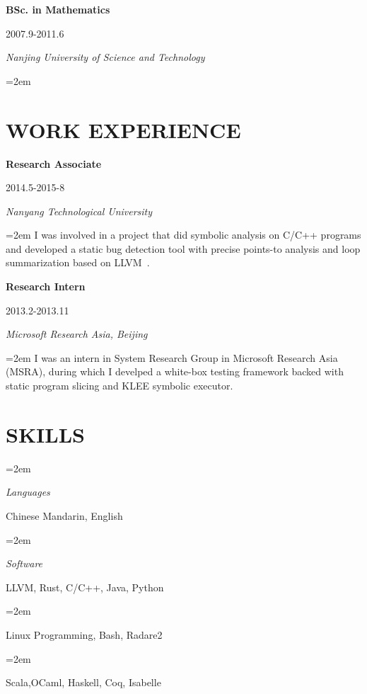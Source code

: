 \documentclass[paper=a4,fontsize=11pt]{article} %
\newlength{\spacebox}
\newcommand{\sepspace}{\vspace*{9pt}}		%
\newcommand{\NewPart}[1]{\section*{\uppercase{#1}}}
\newcommand{\PersonalEntry}[2]{
		\noindent\hangindent=2em\hangafter=0 %
		\parbox{\spacebox}{        %
		\textit{#1}}		       %
		\hspace{1.5em} #2 \par}    %
\newcommand{\SkillsEntry}[2]{      %
		\noindent\hangindent=2em\hangafter=0 %
		\parbox{\spacebox}{        %
		\textit{#1}}			   %
		\hspace{1.5em} #2 \par}    %
\newcommand{\EducationEntry}[4]{
		\noindent \textbf{#1} \hfill      %
			\parbox{12em}{%
			\hfill\color{Black}#2} \par  %
		\noindent \textit{#3} \par        %
		\noindent\hangindent=2em\hangafter=0 \small #4 %
		\normalsize \par}
\begin{document}
\EducationEntry{BSc. in Mathematics}{2007.9-2011.6}{Nanjing University of Science and Technology}{}

\NewPart{Work experience}{}

\EducationEntry{Research Associate}{2014.5-2015-8}{Nanyang Technological University}{
I was involved in a project that did symbolic analysis on C/C++ programs and developed a static bug detection tool with precise points-to analysis and loop summarization based on LLVM~\cite{XieLLLC15}.}
\sepspace

\EducationEntry{Research Intern}{2013.2-2013.11}{Microsoft Research Asia, Beijing}{
    I was an intern in System Research Group in Microsoft Research Asia (MSRA), during which I develped a white-box testing framework backed with static program slicing and KLEE symbolic executor.}
\sepspace

\NewPart{Skills}{}

\SkillsEntry{Languages}{Chinese Mandarin, English}
\SkillsEntry{Software}{{LLVM, Rust, C/C++, Java, Python}}
\SkillsEntry{}{Linux Programming, Bash, Radare2}
\SkillsEntry{}{Scala,OCaml, Haskell, Coq, Isabelle}

\pagebreak
\end{document}
